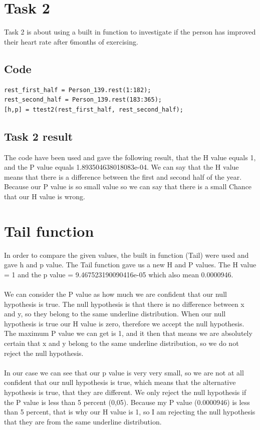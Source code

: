 \documentclass{article}
\begin{document}
\section{Task 2}
Task 2 is about using a built in function to investigate if the person has improved their heart rate after 6months of exercising. 
\subsection{Code}
\begin{tcolorbox}
\begin{verbatim}
rest_first_half = Person_139.rest(1:182);
rest_second_half = Person_139.rest(183:365);
[h,p] = ttest2(rest_first_half, rest_second_half);
\end{verbatim}
\end{tcolorbox}

\subsection{Task 2 result}
The code have been used and gave the following result, that the H value equals 1, and the P value equals 1.893504638018083e-04. We can say that the H value means that there is a difference between the first and second half of the year. Because our P value is so small value so we can say that there is a small Chance that our H value is wrong. 

\newpage
\section{Tail function}
In order to compare the given values, the built in function (Tail) were used and gave h and p value. The Tail function gave us a new H and P values. The H value = 1 and the p value = 9.467523190090416e-05 which also mean 0.0000946.\\
\\We can consider the P value as how much we are confident that our null hypothesis is true. The null hypothesis is that there is no difference between x and y, so they belong to the same underline distribution. When our null hypothesis is true our H value is zero, therefore we accept the null hypothesis. The maximum P value we can get is 1, and it then that means we are absolutely certain that x and y belong to the same underline distribution, so we do not reject the null hypothesis.\\
\\In our case we can see that our p value is very very small, so we are not at all confident that our null hypothesis is true, which means that the alternative hypothesis is true, that they are different. We only reject the null hypothesis if the P value is less than 5 percent (0,05). Because my P value (0.0000946) is less than 5 percent, that is why our H value is 1, so I am rejecting the null hypothesis that they are from the same underline distribution.
\end{document}
